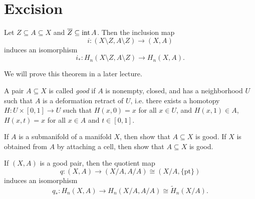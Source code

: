 \section{Excision}

\begin{theorem}[Excision]
  Let $Z \subseteq A \subseteq X$ and
  $\overline{Z} \subseteq \operatorname{int} A$. Then the
  inclusion map
  \[
    i : (X \setminus Z, A \setminus Z) \to (X, A)
  \]
  induces an isomorphism
  \[
    i_* : H_n(X \setminus Z, A \setminus Z) \to H_n(X, A).
  \]
\end{theorem}

\begin{remark}
  We will prove this theorem in a later lecture.
\end{remark}

\begin{definition}
  A pair $A \subseteq X$ is called
  \emph{good} if $A$ is nonempty, closed, and has
  a neighborhood $U$ such that
  $A$ is a deformation retract of $U$, i.e.
  there exists a homotopy $H : U \times [0, 1] \to U$
  such that $H(x, 0) = x$ for all $x \in U$, and
  $H(x, 1) \in A$,
  $H(x, t) = x$ for all $x \in A$ and $t \in [0, 1]$.
\end{definition}

\begin{exercise}
  If $A$ is a submanifold of a manifold $X$, then
  show that $A \subseteq X$ is good.
  If $X$ is obtained from $A$ by attaching a cell,
  then show that $A \subseteq X$ is good.
\end{exercise}

\begin{theorem}
  If $(X, A)$ is a good pair, then
  the quotient map
  \[q : (X, A) \to (X/A, A/A) \cong (X / A, \{\mathrm{pt}\})\]
  induces an isomorphism
  \[q_* : H_n(X, A) \to H_n(X/A, A/A) \cong \widetilde{H}_n(X / A).\]
\end{theorem}

